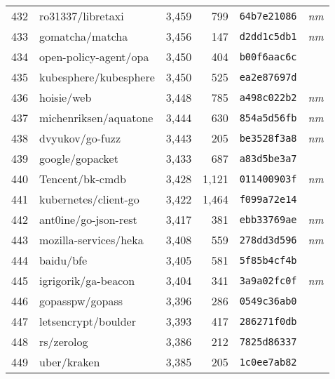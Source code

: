 {\begin{supertabular}{llrrll}
        432 &                  ro31337/libretaxi &  3,459 &    799 &  \texttt{64b7e21086} &  \textit{nm} \\
        433 &                    gomatcha/matcha &  3,456 &    147 &  \texttt{d2dd1c5db1} &  \textit{nm} \\
        434 &              open-policy-agent/opa &  3,450 &    404 &  \texttt{b00f6aac6c} &              \\
        435 &              kubesphere/kubesphere &  3,450 &    525 &  \texttt{ea2e87697d} &              \\
        436 &                         hoisie/web &  3,448 &    785 &  \texttt{a498c022b2} &  \textit{nm} \\
        437 &              michenriksen/aquatone &  3,444 &    630 &  \texttt{854a5d56fb} &  \textit{nm} \\
        438 &                    dvyukov/go-fuzz &  3,443 &    205 &  \texttt{be3528f3a8} &  \textit{nm} \\
        439 &                    google/gopacket &  3,433 &    687 &  \texttt{a83d5be3a7} &              \\
        440 &                    Tencent/bk-cmdb &  3,428 &  1,121 &  \texttt{011400903f} &  \textit{nm} \\
        441 &               kubernetes/client-go &  3,422 &  1,464 &  \texttt{f099a72e14} &              \\
        442 &               ant0ine/go-json-rest &  3,417 &    381 &  \texttt{ebb33769ae} &  \textit{nm} \\
        443 &              mozilla-services/heka &  3,408 &    559 &  \texttt{278dd3d596} &  \textit{nm} \\
        444 &                          baidu/bfe &  3,405 &    581 &  \texttt{5f85b4cf4b} &              \\
        445 &                igrigorik/ga-beacon &  3,404 &    341 &  \texttt{3a9a02fc0f} &  \textit{nm} \\
        446 &                    gopasspw/gopass &  3,396 &    286 &  \texttt{0549c36ab0} &              \\
        447 &                letsencrypt/boulder &  3,393 &    417 &  \texttt{286271f0db} &              \\
        448 &                         rs/zerolog &  3,386 &    212 &  \texttt{7825d86337} &              \\
        449 &                        uber/kraken &  3,385 &    205 &  \texttt{1c0ee7ab82} &              \\

\end{supertabular}}

